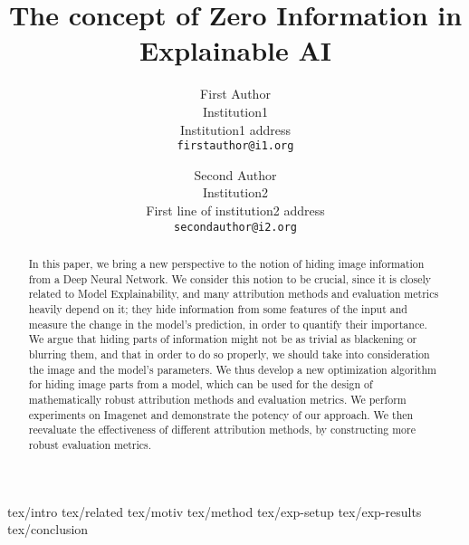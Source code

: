 \documentclass[10pt,twocolumn,letterpaper]{article}
\begin{document}



\title{The concept of Zero Information in Explainable AI}

\author{First Author\\
Institution1\\
Institution1 address\\
{\tt\small firstauthor@i1.org}
\and
Second Author\\
Institution2\\
First line of institution2 address\\
{\tt\small secondauthor@i2.org}
}

\maketitle
\ifwacvfinal\thispagestyle{empty}\fi

\begin{abstract}
In this paper, we bring a new perspective to the notion of hiding image information from a Deep Neural Network. We consider this notion to be crucial, since it is closely related to Model Explainability, and many attribution methods and evaluation metrics heavily depend on it; they hide information from some features of the input and measure the change in the model's prediction, in order to quantify  their importance. We argue that hiding parts of information might not be as trivial as blackening or blurring them, and that in order to do so properly, we should take into consideration the image and the model's parameters. 
We thus develop a new optimization algorithm for hiding image parts from a model, which can be used for the design of mathematically robust attribution methods and evaluation metrics. We perform experiments on Imagenet and demonstrate the potency of our approach. We then reevaluate the effectiveness of different attribution methods, by constructing more robust evaluation metrics. 
\end{abstract}

{tex/intro}
{tex/related}
{tex/motiv}
{tex/method}
{tex/exp-setup}
{tex/exp-results}  
{tex/conclusion}

{\small


}
\end{document}
